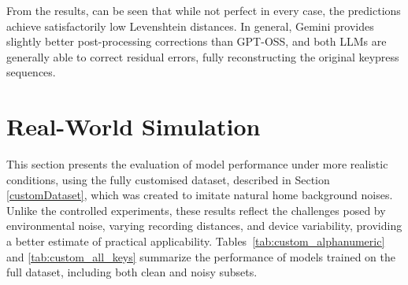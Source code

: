 \documentclass[a4paper,11pt,twoside]{report}
\theoremstyle{definition}
\begin{document}
\vspace{1em}

From the results, can be seen that while not perfect in every case, the predictions achieve satisfactorily low Levenshtein distances. In general, Gemini provides slightly better post-processing corrections than GPT-OSS, and both LLMs are generally able to correct residual errors, fully reconstructing the original keypress sequences.

\section{Real-World Simulation}


This section presents the evaluation of model performance under more realistic conditions, using the fully customised dataset, described in Section \ref{customDataset}, which was created to imitate natural home background noises. Unlike the controlled experiments, these results reflect the challenges posed by environmental noise, varying recording distances, and device variability, providing a better estimate of practical applicability. Tables~\ref{tab:custom_alphanumeric} and \ref{tab:custom_all_keys} summarize the performance of models trained on the full dataset, including both clean and noisy subsets.
\end{document}
